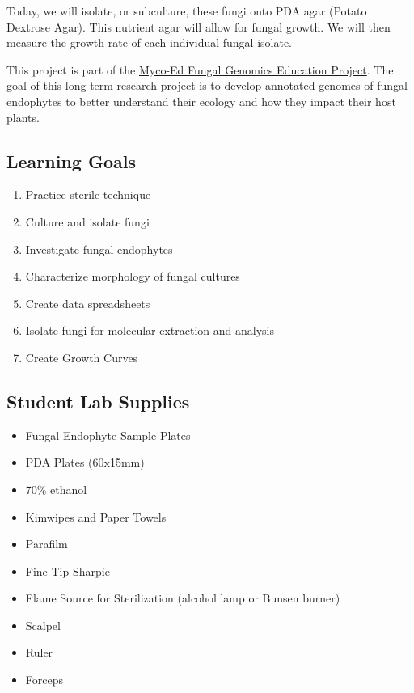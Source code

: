 \documentclass[
  letterpaper,
  DIV=11,
  numbers=noendperiod]{scrreprt}
\providecommand{\tightlist}{%
  \setlength{\itemsep}{0pt}\setlength{\parskip}{0pt}}
\begin{document}
Today, we will isolate, or subculture, these fungi onto PDA agar (Potato
Dextrose Agar). This nutrient agar will allow for fungal growth. We will
then measure the growth rate of each individual fungal isolate.

This project is part of the
\href{https://mycocosm.jgi.doe.gov/mycocosm/home/myco-ed}{Myco-Ed Fungal
Genomics Education Project}. The goal of this long-term research project
is to develop annotated genomes of fungal endophytes to better
understand their ecology and how they impact their host plants.

\subsection*{Learning Goals}\label{learning-goals-1}

\begin{enumerate}
\def\labelenumi{\arabic{enumi}.}
\tightlist
\item
  Practice sterile technique
\item
  Culture and isolate fungi
\item
  Investigate fungal endophytes
\item
  Characterize morphology of fungal cultures
\item
  Create data spreadsheets
\item
  Isolate fungi for molecular extraction and analysis
\item
  Create Growth Curves
\end{enumerate}

\subsection*{Student Lab Supplies}\label{student-lab-supplies}

\begin{itemize}
\tightlist
\item
  Fungal Endophyte Sample Plates
\item
  PDA Plates (60x15mm)
\item
  70\% ethanol
\item
  Kimwipes and Paper Towels
\item
  Parafilm
\item
  Fine Tip Sharpie
\item
  Flame Source for Sterilization (alcohol lamp or Bunsen burner)
\item
  Scalpel
\item
  Ruler
\item
  Forceps
\end{itemize}
\end{document}
